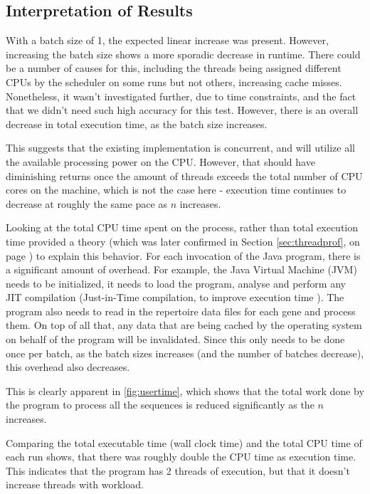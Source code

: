 \documentclass[a4paper,12pt]{report}
\begin{document}
\subsection{Interpretation of Results}
\label{sec:threadbench}
With a batch size of 1, the expected linear increase was present. However, increasing the batch size shows a more sporadic decrease in runtime. There could be a number of causes for this, including the threads being assigned different CPUs by the scheduler on some runs but not others, increasing cache misses. Nonetheless, it wasn't investigated further, due to time constraints, and the fact that we didn't need such high accuracy for this test. However, there is an overall decrease in total execution time, as the batch size increases.

This suggests that the existing implementation is concurrent, and will utilize all the available processing power on the CPU. However, that should have diminishing returns once the amount of threads exceeds the total number of CPU cores on the machine, which is not the case here - execution time continues to decrease at roughly the same pace as $n$ increases.

Looking at the total CPU time spent on the process, rather than total execution time provided a theory (which was later confirmed in Section \ref{sec:threadprof}, on page \pageref{sec:threadprof}) to explain this behavior.
For each invocation of the Java program, there is a significant amount of overhead. For example, the Java Virtual Machine (JVM) needs to be initialized, it needs to load the program, analyse and perform any JIT compilation (Just-in-Time compilation, to improve execution time \autocite{jit}). The program also needs to read in the repertoire data files for each gene and process them. On top of all that, any data that are being cached by the operating system on behalf of the program will be invalidated. Since this only needs to be done once per batch, as the batch sizes increases (and the number of batches decrease), this overhead also decreases.

This is clearly apparent in \autoref{fig:usertime}, which shows that the total work done by the program to process all the sequences is reduced significantly as the $n$ increases.

Comparing the total executable time (wall clock time) and the total CPU time of each run shows, that there was roughly double the CPU time as execution time. This indicates that the program has 2 threads of execution, but that it doesn't increase threads with workload.
\end{document}
